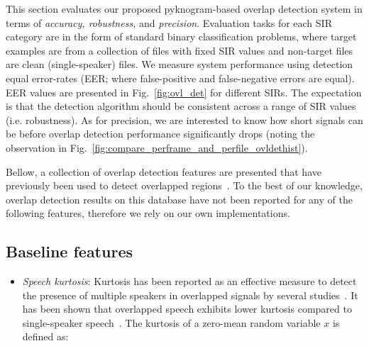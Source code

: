 {%

This section evaluates our proposed pyknogram-based overlap detection system in terms of {\it accuracy, robustness,} and {\it precision}. 
Evaluation tasks for each SIR category are in the form of standard binary classification problems, where target examples are from a collection of files with fixed SIR values and non-target files are clean (single-speaker) files. 
We measure system performance using detection equal error-rates (EER; where false-positive and false-negative errors are equal). 
EER values are presented in Fig.~\ref{fig:ovl_det} for different SIRs. 
The expectation is that the detection algorithm should be consistent across a range of SIR values (i.e. robustness). 
As for precision, we are interested to know how short signals can be before overlap detection performance significantly drops (noting the observation in Fig.~\ref{fig:compare_perframe_and_perfile_ovldethist}). 


Bellow, a collection of overlap detection features are presented that have previously been used to detect overlapped regions~\cite{nav_icassp13,boakye_thesis,sapvr_2000}. 
To the best of our knowledge, overlap detection results on this database have not been reported for any of the following features, therefore we rely on our own implementations. %


\subsection{Baseline features}
\label{ssec:baseline}
\begin{itemize}
  \item {\it Speech kurtosis}: Kurtosis has been reported as an effective measure to detect the presence of multiple speakers in overlapped signals by several studies~\cite{Wrigley_05,boakye_thesis,temple_kurtosis}. 
  It has been shown that overlapped speech exhibits lower kurtosis compared to single-speaker speech~\cite{leblanc_deleon98}. The kurtosis of a zero-mean random variable $x$ is defined as:


\end{itemize}}
